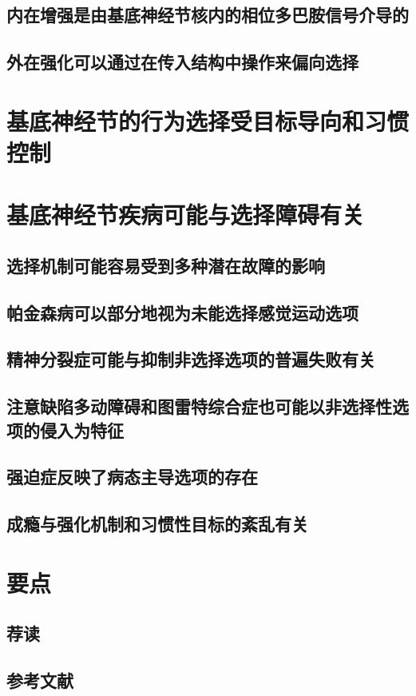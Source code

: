 \subsection{内在增强是由基底神经节核内的相位多巴胺信号介导的}
\subsection{外在强化可以通过在传入结构中操作来偏向选择}

\section{基底神经节的行为选择受目标导向和习惯控制}

\section{基底神经节疾病可能与选择障碍有关}
\subsection{选择机制可能容易受到多种潜在故障的影响}
\subsection{帕金森病可以部分地视为未能选择感觉运动选项}
\subsection{精神分裂症可能与抑制非选择选项的普遍失败有关}
\subsection{注意缺陷多动障碍和图雷特综合症也可能以非选择性选项的侵入为特征}
\subsection{强迫症反映了病态主导选项的存在}
\subsection{成瘾与强化机制和习惯性目标的紊乱有关}

\section{要点}
\subsection{荐读}
\subsection{参考文献}
